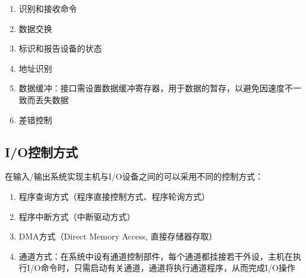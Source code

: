 \documentclass[./computer-organization-and-architecture.tex]{subfiles}
\begin{document}
    \begin{enumerate}
        \item 识别和接收命令
        \item 数据交换
        \item 标识和报告设备的状态
        \item 地址识别
        \item 数据缓冲：接口需设置数据缓冲寄存器，用于数据的暂存，以避免因速度不一致而丢失数据
        \item 差错控制
    \end{enumerate}

    \subsection{I/O控制方式}

    在输入/输出系统实现主机与I/O设备之间的{\color{red}{数据传送}}可以采用不同的控制方式：

    \begin{enumerate}
        \item 程序查询方式（程序直接控制方式、程序轮询方式）
        \item 程序中断方式（中断驱动方式）
        \item DMA方式（Direct Memory Access, 直接存储器存取）
        \item 通道方式：在系统中设有通道控制部件，每个通道都挂接若干外设，主机在执行I/O命令时，只需启动有关通道，通道将执行通道程序，从而完成I/O操作
    \end{enumerate}
\end{document}
